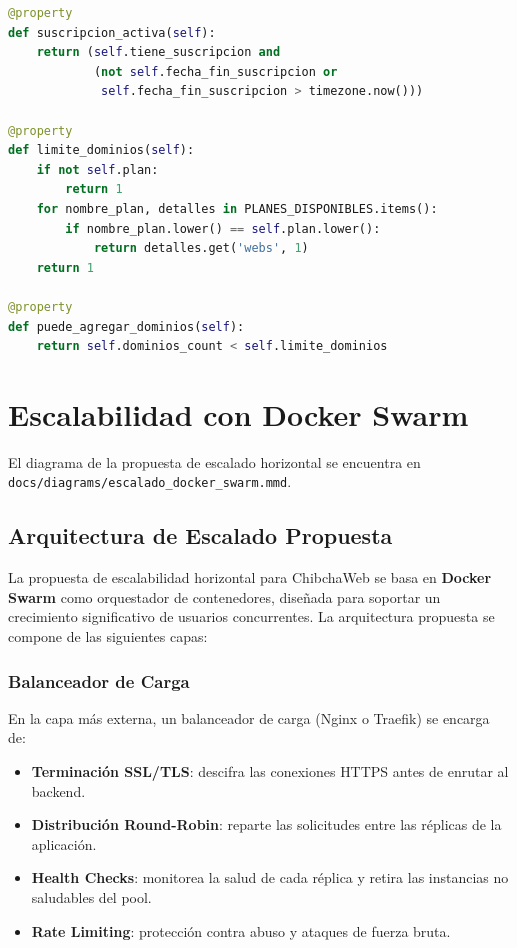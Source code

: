 \documentclass[12pt, a4paper]{article}
\begin{document}
\begin{lstlisting}[language=Python, caption={Properties computadas del modelo Cliente}]
@property
def suscripcion_activa(self):
    return (self.tiene_suscripcion and
            (not self.fecha_fin_suscripcion or
             self.fecha_fin_suscripcion > timezone.now()))

@property
def limite_dominios(self):
    if not self.plan:
        return 1
    for nombre_plan, detalles in PLANES_DISPONIBLES.items():
        if nombre_plan.lower() == self.plan.lower():
            return detalles.get('webs', 1)
    return 1

@property
def puede_agregar_dominios(self):
    return self.dominios_count < self.limite_dominios
\end{lstlisting}

\section{Escalabilidad con Docker Swarm}
\label{sec:escalado}

El diagrama de la propuesta de escalado horizontal se encuentra en \texttt{docs/diagrams/escalado\_docker\_swarm.mmd}.

\subsection{Arquitectura de Escalado Propuesta}

La propuesta de escalabilidad horizontal para ChibchaWeb se basa en \textbf{Docker Swarm} como orquestador de contenedores, diseñada para soportar un crecimiento significativo de usuarios concurrentes. La arquitectura propuesta se compone de las siguientes capas:

\subsubsection{Balanceador de Carga}

En la capa más externa, un balanceador de carga (Nginx o Traefik) se encarga de:
\begin{itemize}
    \item \textbf{Terminación SSL/TLS}: descifra las conexiones HTTPS antes de enrutar al backend.
    \item \textbf{Distribución Round-Robin}: reparte las solicitudes entre las réplicas de la aplicación.
    \item \textbf{Health Checks}: monitorea la salud de cada réplica y retira las instancias no saludables del pool.
    \item \textbf{Rate Limiting}: protección contra abuso y ataques de fuerza bruta.
\end{itemize}
\end{document}
